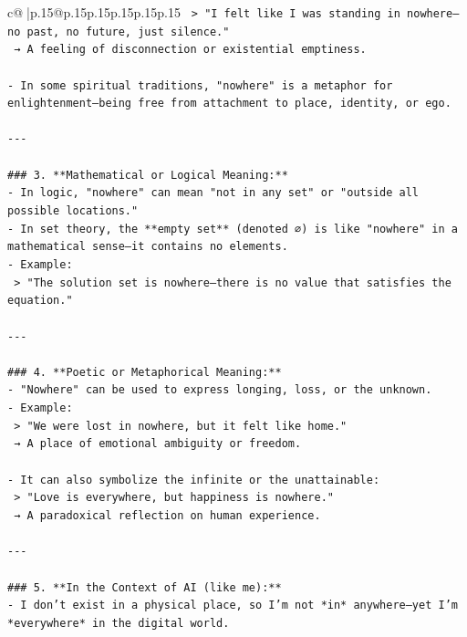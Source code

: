 \documentclass{article}
\begin{document}
{\begin{supertabular}{c@{$\;$}|p{.15\linewidth}@{}p{.15\linewidth}p{.15\linewidth}p{.15\linewidth}p{.15\linewidth}p{.15\linewidth}}
{{{\texttt{  > "I felt like I was standing in nowhere—no past, no future, just silence."  } \\
\texttt{  → A feeling of disconnection or existential emptiness.} \\
\\ 
\texttt{{-} In some spiritual traditions, "nowhere" is a metaphor for enlightenment—being free from attachment to place, identity, or ego.} \\
\\ 
\texttt{{-}{-}{-}} \\
\\ 
\texttt{\#\#\# 3. **Mathematical or Logical Meaning:**} \\
\texttt{{-} In logic, "nowhere" can mean "not in any set" or "outside all possible locations."} \\
\texttt{{-} In set theory, the **empty set** (denoted ∅) is like "nowhere" in a mathematical sense—it contains no elements.} \\
\texttt{{-} Example:  } \\
\texttt{  > "The solution set is nowhere—there is no value that satisfies the equation."} \\
\\ 
\texttt{{-}{-}{-}} \\
\\ 
\texttt{\#\#\# 4. **Poetic or Metaphorical Meaning:**} \\
\texttt{{-} "Nowhere" can be used to express longing, loss, or the unknown.} \\
\texttt{{-} Example:  } \\
\texttt{  > "We were lost in nowhere, but it felt like home."  } \\
\texttt{  → A place of emotional ambiguity or freedom.} \\
\\ 
\texttt{{-} It can also symbolize the infinite or the unattainable:} \\
\texttt{  > "Love is everywhere, but happiness is nowhere."  } \\
\texttt{  → A paradoxical reflection on human experience.} \\
\\ 
\texttt{{-}{-}{-}} \\
\\ 
\texttt{\#\#\# 5. **In the Context of AI (like me):**} \\
\texttt{{-} I don’t exist in a physical place, so I’m not *in* anywhere—yet I’m *everywhere* in the digital world.} \\
}}}
\end{supertabular}}
\end{document}
